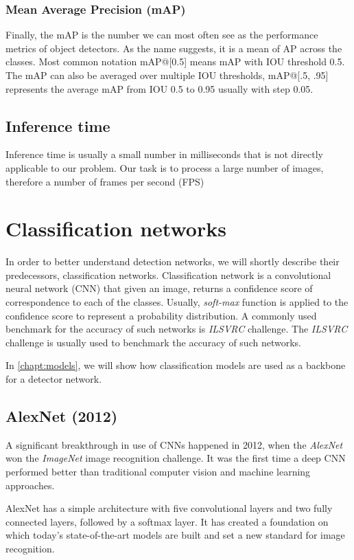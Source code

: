\subsubsection{Mean Average Precision (mAP)}
Finally, the mAP is the number we can most often see as the performance metrics of object detectors. As the name suggests, it is a mean of AP across the classes. Most common notation mAP@[0.5] means mAP with IOU threshold 0.5. The mAP can also be averaged over multiple IOU thresholds, mAP@[.5, .95] represents the average mAP from IOU 0.5 to 0.95 usually with step 0.05.

\subsection*{Inference time}
Inference time is usually a small number in milliseconds that is not directly applicable to our problem. Our task is to process a large number of images, therefore a number of frames per second (FPS)   


\section{Classification networks}
\label{chapt:cnets}
In order to better understand detection networks, we will shortly describe their predecessors, classification networks. Classification network is a convolutional neural network (CNN) \cite[ch.~9]{bib:dlbook} that given an image, returns a confidence score of correspondence to each of the classes. Usually, \textit{soft-max} function is applied to the confidence score to represent a probability distribution. A commonly used benchmark for the accuracy of such networks is \textit{ILSVRC} challenge.
The \textit{ILSVRC} challenge is usually used to benchmark the accuracy of such networks.

In \cref{chapt:models}, we will show how classification models are used as a backbone for a detector network.

\subsection{AlexNet (2012)}
A significant breakthrough in use of CNNs happened in 2012, when the \textit{AlexNet} \cite{bib:alexnet} won the \textit{ImageNet} image recognition challenge. It was the first time a deep CNN performed better than traditional computer vision and machine learning approaches. 

AlexNet has a simple architecture with five convolutional layers and two fully connected layers, followed by a softmax layer. It has created a foundation on which today's state-of-the-art models are built and set a new standard for image recognition.

